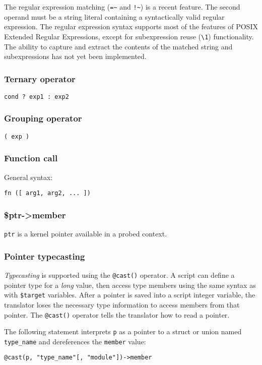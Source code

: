 \documentclass[twoside,english]{article}
\newenvironment{vindent}
{\begin{list}{}{\setlength{\listparindent}{6pt}}
\item[]}
{\end{list}}
\begin{document}
The regular expression matching (\verb+=~+ and \verb+!~+) is a
recent feature. The second operand must be a string literal
containing a syntactically valid regular expression. The regular
expression syntax supports most of the features of POSIX Extended
Regular Expressions, except for subexpression reuse (\verb+\1+)
functionality. The ability to capture and extract the contents of the
matched string and subexpressions has not yet been implemented.

\subsubsection{Ternary operator\label{sub:Ternary-operator}}
\texttt{cond ? exp1 : exp2}


\subsubsection{Grouping operator}
\texttt{( exp )}


\subsubsection{Function call}
General syntax:

\texttt{fn ({[} arg1, arg2, ... ])}


\subsubsection{\$ptr-\textgreater member}
\texttt{ptr} is a kernel pointer available in a probed context.


\subsubsection{Pointer typecasting}

\emph{Typecasting} is supported using the \texttt{@cast()} operator. A
script can define a pointer type for a \emph{long} value, then access
type members using the same syntax as with \texttt{\$target}
variables. After a pointer is saved into a script integer variable,
the translator loses the necessary type information to access members
from that pointer.  The \texttt{@cast()} operator tells the translator
how to read a pointer.

The following statement interprets \texttt{p} as a pointer to a struct
or union named \texttt{type\_name} and dereferences the
\texttt{member} value:
\begin{vindent}
\begin{verbatim}
@cast(p, "type_name"[, "module"])->member
\end{verbatim}
\end{vindent}
\end{document}
